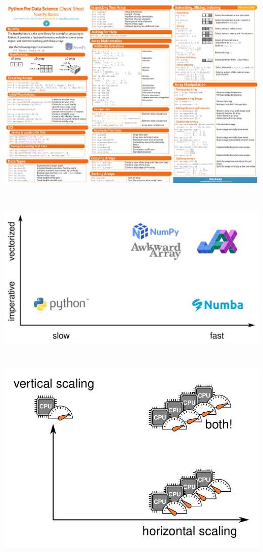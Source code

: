 \documentclass[aspectratio=169]{beamer}
\begin{document}
\begin{frame}{\mbox{ }}
\begin{center}
\includegraphics[width=0.8\linewidth]{img/Numpy_Python_Cheat_Sheet.pdf}
\end{center}
\end{frame}

\begin{frame}{\mbox{ }}
\vspace{0.5 cm}
\begin{center}
\includegraphics[width=0.9\linewidth]{img/slow-fast-imperative-vectorized.pdf}
\end{center}
\end{frame}

\begin{frame}{\mbox{ }}
\vspace{0.75 cm}
\begin{center}
\includegraphics[width=0.6\linewidth]{img/horizontal-and-vertical-scaling.pdf}
\end{center}
\end{frame}
\end{document}
